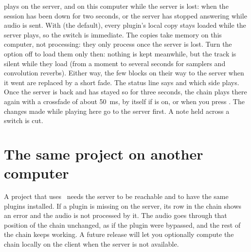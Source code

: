  plays on the server, and on this computer while the server is
lost: when the session has been down for two seconds, or the server has
stopped answering while audio is sent. With  (the default), every plugin's local copy stays loaded while the
server plays, so the switch is immediate. The copies take memory on this
computer, not processing: they only process once the server is lost. Turn
the option off to load them only then: nothing is kept meanwhile, but the
track is silent while they load (from a moment to several seconds for
samplers and convolution reverbs). Either way, the few blocks on their way
to the server when it went are replaced by a short fade.
The status line says  and which side plays. Once the server is
back and has stayed so for three seconds, the chain plays there again with
a crossfade of about 50~ms, by itself if 
is on, or when you press . The changes made while
playing here go to the server first. A note held across a switch is cut.

\section{The same project on another computer}
\label{sec:sessions}

A project that uses \fxme\ needs the server to be reachable and to have the
same plugins installed. If a plugin is missing on the server, its row in the
chain shows an error and the audio is not processed by it. The audio goes through that position of the chain unchanged, as if the plugin were bypassed, and the rest of the chain keeps working. A future release will let you optionally compute the chain locally on the client when the server is not available.
